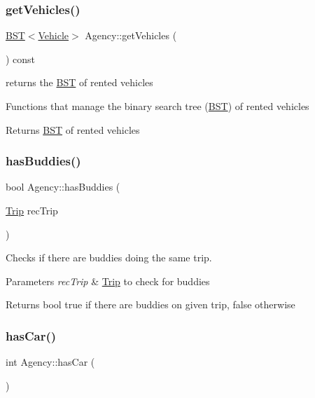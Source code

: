 \subsubsection{\texorpdfstring{get\+Vehicles()}{getVehicles()}}
{\footnotesize\ttfamily \hyperlink{class_b_s_t}{B\+ST}$<$\hyperlink{class_vehicle}{Vehicle}$>$ Agency\+::get\+Vehicles (\begin{DoxyParamCaption}{ }\end{DoxyParamCaption}) const\hspace{0.3cm}{\ttfamily [inline]}}



returns the \hyperlink{class_b_s_t}{B\+ST} of rented vehicles 

Functions that manage the binary search tree (\hyperlink{class_b_s_t}{B\+ST}) of rented vehicles \begin{DoxyReturn}{Returns}
\hyperlink{class_b_s_t}{B\+ST} of rented vehicles 
\end{DoxyReturn}
\mbox{\label{group___agency_gaa7fe817661a5e46322db9e809ac54fe9}} 
\subsubsection{\texorpdfstring{has\+Buddies()}{hasBuddies()}}
{\footnotesize\ttfamily bool Agency\+::has\+Buddies (\begin{DoxyParamCaption}\item[{\hyperlink{class_trip}{Trip}}]{rec\+Trip }\end{DoxyParamCaption})}



Checks if there are buddies doing the same trip. 


\begin{DoxyParams}{Parameters}
{\em rec\+Trip} & \hyperlink{class_trip}{Trip} to check for buddies\\
\hline
\end{DoxyParams}
\begin{DoxyReturn}{Returns}
bool true if there are buddies on given trip, false otherwise 
\end{DoxyReturn}
\mbox{\label{group___agency_ga7b37fecbc7cf1524b841ac82be7a7d29}} 
\subsubsection{\texorpdfstring{has\+Car()}{hasCar()}}
{\footnotesize\ttfamily int Agency\+::has\+Car (\begin{DoxyParamCaption}{ }\end{DoxyParamCaption})}



